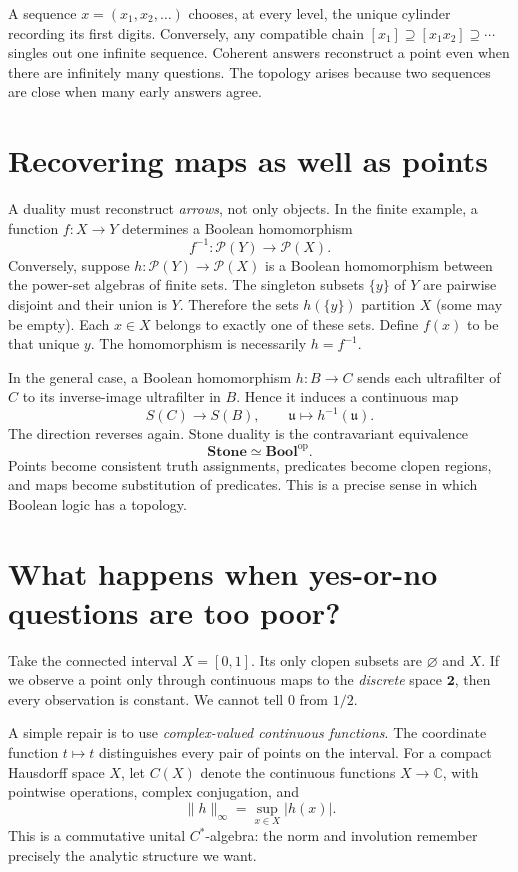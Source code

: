 A sequence $x=(x_1,x_2,\ldots)$ chooses, at every level, the unique cylinder recording its first digits. Conversely, any compatible chain $[x_1]\supseteq[x_1x_2]\supseteq\cdots$ singles out one infinite sequence. Coherent answers reconstruct a point even when there are infinitely many questions. The topology arises because two sequences are close when many early answers agree.


\section{Recovering maps as well as points}

A duality must reconstruct \emph{arrows}, not only objects. In the finite example, a function $f:X\to Y$ determines a Boolean homomorphism
\[
 f^{-1}:\mathcal P(Y)\to\mathcal P(X).
\]
Conversely, suppose $h:\mathcal P(Y)\to\mathcal P(X)$ is a Boolean homomorphism between the power-set algebras of finite sets. The singleton subsets $\{y\}$ of $Y$ are pairwise disjoint and their union is $Y$. Therefore the sets $h(\{y\})$ partition $X$ (some may be empty). Each $x\in X$ belongs to exactly one of these sets. Define $f(x)$ to be that unique $y$. The homomorphism is necessarily $h=f^{-1}$.

In the general case, a Boolean homomorphism $h:B\to C$ sends each ultrafilter of $C$ to its inverse-image ultrafilter in $B$. Hence it induces a continuous map
\[
 S(C)\longrightarrow S(B),\qquad
 \mathfrak u\longmapsto h^{-1}(\mathfrak u).
\]
The direction reverses again. Stone duality is the contravariant equivalence
\[
 \boxed{\mathbf{Stone}\simeq\mathbf{Bool}^{\mathrm{op}}.}
\]
Points become consistent truth assignments, predicates become clopen regions, and maps become substitution of predicates. This is a precise sense in which Boolean logic has a topology.


\section{What happens when yes-or-no questions are too poor?}

Take the connected interval $X=[0,1]$. Its only clopen subsets are $\varnothing$ and $X$. If we observe a point only through continuous maps to the \emph{discrete} space $\mathbf2$, then every observation is constant. We cannot tell $0$ from $1/2$.

A simple repair is to use \emph{complex-valued continuous functions}. The coordinate function $t\mapsto t$ distinguishes every pair of points on the interval. For a compact Hausdorff space $X$, let $C(X)$ denote the continuous functions $X\to\mathbb C$, with pointwise operations, complex conjugation, and
\[
 \|h\|_\infty=\sup_{x\in X}|h(x)|.
\]
This is a commutative unital $C^*$-algebra: the norm and involution remember precisely the analytic structure we want.

